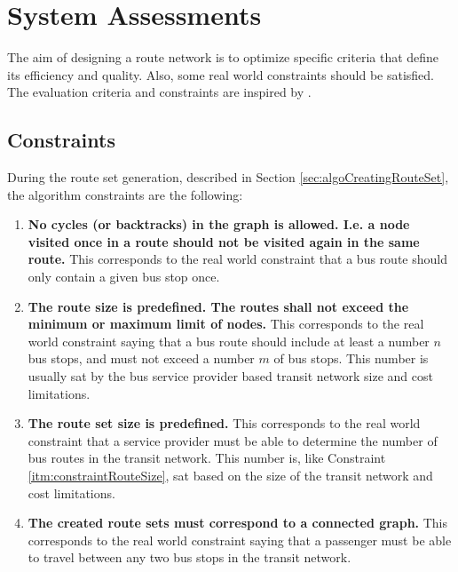 \section{System Assessments}
The aim of designing a route network is to optimize specific criteria that define its efficiency and quality. Also, some real world constraints should be satisfied. The evaluation criteria and constraints are inspired by \citep{kechagiopoulos14}.

\subsection{Constraints}
\label{sec:algoConstraints}
During the route set generation, described in Section \vref{sec:algoCreatingRouteSet}, the algorithm constraints are the following:
\begin{enumerate}
\item \label{itm:constraintCycles} \textbf{No cycles (or backtracks) in the graph is allowed. I.e. a node visited once in a route should not be visited again in the same route.}
This corresponds to the real world constraint that a bus route should only contain a given bus stop once. 
\item \label{itm:constraintRouteSize} \textbf{The route size is predefined. The routes shall not exceed the minimum or maximum limit of nodes.}
This corresponds to the real world constraint saying that a bus route should include at least a number $n$ bus stops, and must not exceed a number $m$ of bus stops. This number is usually sat by the bus service provider based transit network size and cost limitations. 
\item \label{itm:constraintRouteSetSize} \textbf{The route set size is predefined.}
This corresponds to the real world constraint that a service provider must be able to determine the number of bus routes in the transit network. This number is, like Constraint \ref{itm:constraintRouteSize}, sat based on the size of the transit network and cost limitations. 
\item \label{itm:criteriaConnectedGraph} \textbf{The created route sets must correspond to a connected graph.}
This corresponds to the real world constraint saying that a passenger must be able to travel between any two bus stops in the transit network. 
\end{enumerate}

